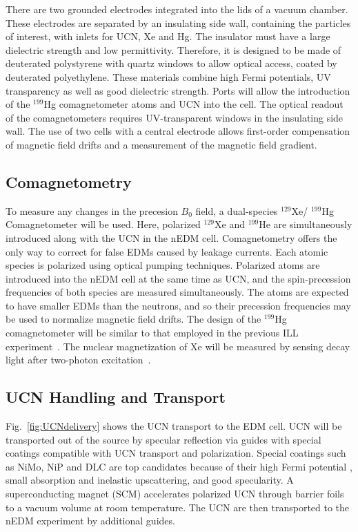 There are two grounded electrodes integrated into the lids of a vacuum
chamber. These electrodes are separated by an insulating side wall,
containing the particles of interest, with inlets for UCN, Xe and
Hg. The insulator must have a large dielectric strength and low
permittivity. Therefore, it is designed to be made of deuterated
polystyrene with quartz windows to allow optical access, coated by
deuterated polyethylene. These materials combine high Fermi
potentials, UV transparency as well as good dielectric strength.
Ports will allow the introduction of the $^{199}$Hg comagnetometer
atoms and UCN into the cell. The optical readout of the
comagnetometers requires UV-transparent windows in the insulating side
wall. The use of two cells with a central electrode allows first-order
compensation of magnetic field drifts and a measurement of the
magnetic field gradient.


\subsection{Comagnetometry}
To measure any changes in the precesion $B_0$ field, a dual-species
$^{129}$Xe/ $^{199}$Hg Comagnetometer will be used. Here, polarized
$^{129}$Xe and $^{199}$He are simultaneously introduced along with the
UCN in the nEDM cell. Comagnetometry offers the only way to correct
for false EDMs caused by leakage currents.  Each atomic species is
polarized using optical pumping techniques. Polarized atoms are
introduced into the nEDM cell at the same time as UCN, and the
spin-precession frequencies of both species are measured
simultaneously. The atoms are expected to have smaller EDMs than the
neutrons, and so their precession frequencies may be used to normalize
magnetic field drifts.  The design of the $^{199}$Hg comagnetometer
will be similar to that employed in the previous ILL
experiment~\cite{Baker2006,Griffith2009}. The nuclear magnetization of
Xe will be measured by sensing decay light after two-photon
excitation~\cite{momose2014development}.


\subsection{UCN Handling and Transport}
Fig.~\ref{fig:UCNdelivery} shows the UCN transport to the EDM cell.
UCN will be transported out of the source by specular reflection via
guides with special coatings compatible with UCN transport and
polarization. Special coatings such as NiMo, NiP and DLC are top
candidates because of their high Fermi potential , small absorption
and inelastic upscattering, and good specularity.  A superconducting
magnet (SCM) accelerates polarized UCN through barrier foils to a
vacuum volume at room temperature. The UCN are then transported to the
nEDM experiment by additional guides.



